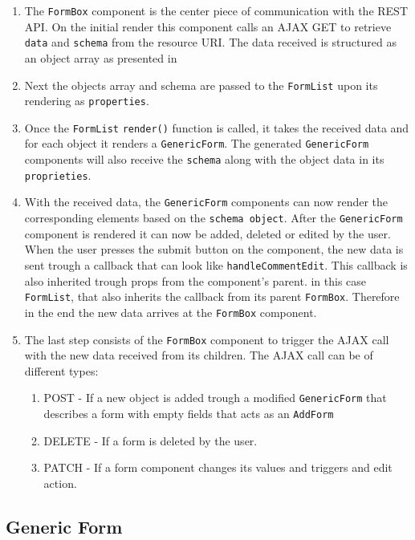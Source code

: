 \begin{enumerate}
	\item The \texttt{FormBox} component is the center piece of communication with the REST API. On the initial render this component calls an AJAX GET to retrieve \texttt{data} and \texttt{schema} from the resource URI. The data received is structured as an object array as presented in 
	\item Next the objects array and schema are passed to the \texttt{FormList} upon its rendering as \texttt{properties}.
	\item Once the \texttt{FormList} \texttt{render()} function is called, it takes the received data and for each object it renders a \texttt{GenericForm}. The generated \texttt{GenericForm} components will also receive the \texttt{schema} along with the object data in its \texttt{proprieties}.
	\item With the received data, the \texttt{GenericForm} components can now render the corresponding elements based on the \texttt{schema object}. After the \texttt{GenericForm} component is rendered it can now be added, deleted or edited by the user. When the user presses the submit button on the component, the new data is sent trough a callback that can look like \texttt{handleCommentEdit}. This callback is also inherited trough props from the component's parent. in this case \texttt{FormList}, that also inherits the callback from its parent \texttt{FormBox}. Therefore in the end the new data arrives at the \texttt{FormBox} component.
	\item The last step consists of the \texttt{FormBox} component to trigger the AJAX call with the new data received from its children. The AJAX call can be of different types:
	\begin{enumerate}
		\item POST - If a new object is added trough a modified \texttt{GenericForm} that describes a form with empty fields that acts as an \texttt{AddForm}
		\item DELETE - If a form is deleted by the user.
		\item PATCH - If a form component changes its values and triggers and edit action.\\
	\end{enumerate}
	
\end{enumerate}


\subsection{Generic Form}
\label{sub-sec:generic-form}

